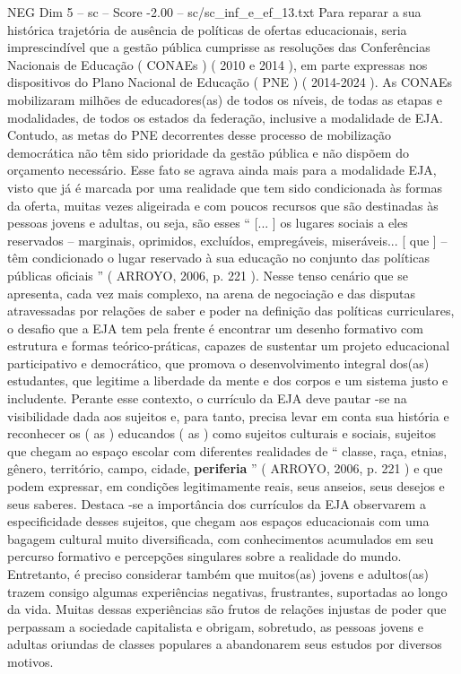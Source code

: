 \begin{textsample}{NEG Dim 5 – sc – Score -2.00 – sc/sc\_inf\_e\_ef\_13.txt}
Para reparar a sua histórica trajetória de ausência de políticas de ofertas educacionais, seria imprescindível que a gestão pública cumprisse as resoluções das Conferências Nacionais de Educação ( CONAEs ) ( 2010 e 2014 ), em parte expressas nos dispositivos do Plano Nacional de Educação ( PNE ) ( 2014-2024 ).
As CONAEs mobilizaram milhões de educadores(as) de todos os níveis, de todas as etapas e modalidades, de todos os estados da federação, inclusive a modalidade de EJA.
Contudo, as metas do PNE decorrentes desse processo de mobilização democrática não têm sido prioridade da gestão pública e não dispõem do orçamento necessário.
Esse fato se agrava ainda mais para a modalidade EJA, visto que já é marcada por uma realidade que tem sido condicionada às formas da oferta, muitas vezes aligeirada e com poucos recursos que são destinadas às pessoas jovens e adultas, ou seja, são esses “ [... ] os lugares sociais a eles reservados – marginais, oprimidos, excluídos, empregáveis, miseráveis... [ que ] – têm condicionado o lugar reservado à sua educação no conjunto das políticas públicas oficiais ” ( ARROYO, 2006, p. 221 ).
Nesse tenso cenário que se apresenta, cada vez mais complexo, na arena de negociação e das disputas atravessadas por relações de saber e poder na definição das políticas curriculares, o desafio que a EJA tem pela frente é encontrar um desenho formativo com estrutura e formas teórico-práticas, capazes de sustentar um projeto educacional participativo e democrático, que promova o desenvolvimento integral dos(as) estudantes, que legitime a liberdade da mente e dos corpos e um sistema justo e includente.
Perante esse contexto, o currículo da EJA deve pautar -se na visibilidade dada aos sujeitos e, para tanto, precisa levar em conta sua história e reconhecer os ( as ) educandos ( as ) como sujeitos culturais e sociais, sujeitos que chegam ao espaço escolar com diferentes realidades de “ classe, raça, etnias, gênero, território, campo, cidade, \textbf{periferia} ” ( ARROYO, 2006, p. 221 ) e que podem expressar, em condições legitimamente reais, seus anseios, seus desejos e seus saberes.
Destaca -se a importância dos currículos da EJA observarem a especificidade desses sujeitos, que chegam aos espaços educacionais com uma bagagem cultural muito diversificada, com conhecimentos acumulados em seu percurso formativo e percepções singulares sobre a realidade do mundo.
Entretanto, é preciso considerar também que muitos(as) jovens e adultos(as) trazem consigo algumas experiências negativas, frustrantes, suportadas ao longo da vida.
Muitas dessas experiências são frutos de relações injustas de poder que perpassam a sociedade capitalista e obrigam, sobretudo, as pessoas jovens e adultas oriundas de classes populares a abandonarem seus estudos por diversos motivos.

\end{textsample}
